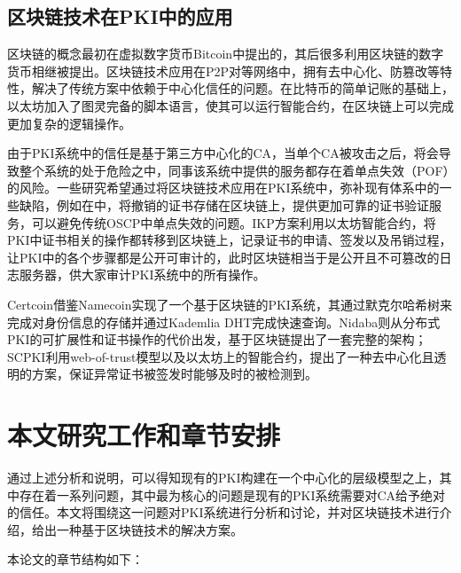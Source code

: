 \subsection{区块链技术在PKI中的应用}

区块链的概念最初在虚拟数字货币Bitcoin中提出的\supercite{nakamoto2008bitcoin}，其后很多利用区块链的数字货币相继被提出。区块链技术应用在P2P对等网络中，拥有去中心化、防篡改等特性，解决了传统方案中依赖于中心化信任的问题。在比特币的简单记账的基础上，以太坊\supercite{buterin2013ethereum}加入了图灵完备的脚本语言，使其可以运行智能合约，在区块链上可以完成更加复杂的逻辑操作。



由于PKI系统中的信任是基于第三方中心化的CA，当单个CA被攻击之后，将会导致整个系统的处于危险之中，同事该系统中提供的服务都存在着单点失效（POF）的风险。一些研究希望通过将区块链技术应用在PKI系统中，弥补现有体系中的一些缺陷，例如在\parencite{baldi2017certificate}中，将撤销的证书存储在区块链上，提供更加可靠的证书验证服务，可以避免传统OSCP中单点失效的问题。IKP\supercite{matsumoto2016ikp}方案利用以太坊智能合约，将PKI中证书相关的操作都转移到区块链上，记录证书的申请、签发以及吊销过程，让PKI中的各个步骤都是公开可审计的，此时区块链相当于是公开且不可篡改的日志服务器，供大家审计PKI系统中的所有操作。



Certcoin\supercite{fromknecht2014decentralized}借鉴Namecoin实现了一个基于区块链的PKI系统，其通过默克尔哈希树来完成对身份信息的存储并通过Kademlia DHT完成快速查询。Nidaba\supercite{rystsovnidaba}则从分布式PKI的可扩展性和证书操作的代价出发，基于区块链提出了一套完整的架构；SCPKI\supercite{al2017scpki}利用web-of-trust模型以及以太坊上的智能合约，提出了一种去中心化且透明的方案，保证异常证书被签发时能够及时的被检测到。



\section{本文研究工作和章节安排}


通过上述分析和说明，可以得知现有的PKI构建在一个中心化的层级模型之上，其中存在着一系列问题，其中最为核心的问题是现有的PKI系统需要对CA给予绝对的信任。本文将围绕这一问题对PKI系统进行分析和讨论，并对区块链技术进行介绍，给出一种基于区块链技术的解决方案。




本论文的章节结构如下：

